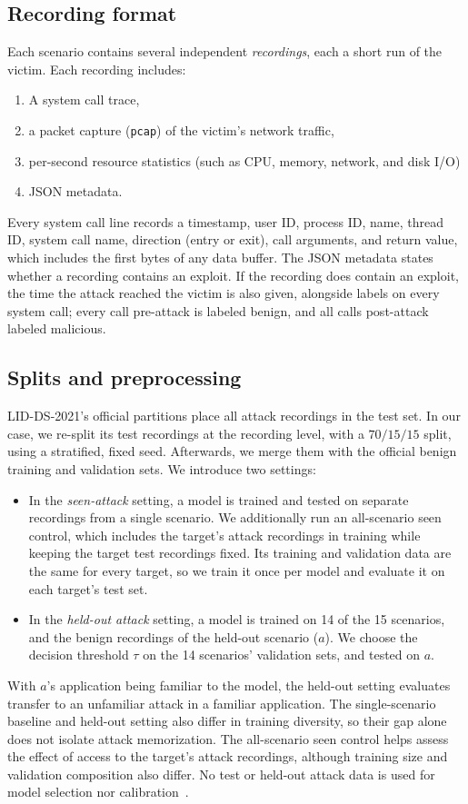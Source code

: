 \documentclass{article}
\begin{document}
\subsection{Recording format}
\label{data:format}
Each scenario contains several independent \emph{recordings}, each a short run of the victim. Each recording includes:
\begin{enumerate}
    \item A system call trace,
    \item a packet capture (\texttt{pcap}) of the victim's network traffic,
    \item per-second resource statistics (such as CPU, memory, network, and disk I/O)
    \item JSON metadata.
\end{enumerate}
Every system call line records a timestamp, user ID, process ID, name, thread ID, system call name, direction (entry or exit), call arguments, and return value, which includes the first bytes of any data buffer. The JSON metadata states whether a recording contains an exploit. If the recording does contain an exploit, the time the attack reached the victim is also given, alongside labels on every system call; every call pre-attack is labeled benign, and all calls post-attack labeled malicious.

\subsection{Splits and preprocessing}
\label{data:splits}
LID-DS-2021's official partitions place all attack recordings in the test set. In our case, we re-split its test recordings at the recording level, with a $70/15/15$ split, using a stratified, fixed seed. Afterwards, we merge them with the official benign training and validation sets. We introduce two settings:
\begin{itemize}
    \item In the \emph{seen-attack} setting, a model is trained and tested on separate recordings from a single scenario. We additionally run an all-scenario seen control, which includes the target's attack recordings in training while keeping the target test recordings fixed. Its training and validation data are the same for every target, so we train it once per model and evaluate it on each target's test set.
    \item In the \emph{held-out attack} setting, a model is trained on 14 of the 15 scenarios, and the benign recordings of the held-out scenario ($a$). We choose the decision threshold $\tau$ on the 14 scenarios' validation sets, and tested on $a$.
\end{itemize}
With $a$'s application being familiar to the model, the held-out setting evaluates transfer to an unfamiliar attack in a familiar application. The single-scenario baseline and held-out setting also differ in training diversity, so their gap alone does not isolate attack memorization. The all-scenario seen control helps assess the effect of access to the target's attack recordings, although training size and validation composition also differ. No test or held-out attack data is used for model selection nor calibration~\citep{arp2022dos}.
 
\end{document}
